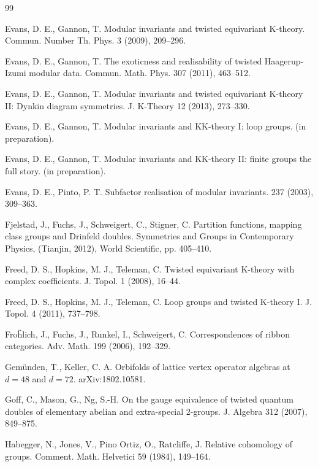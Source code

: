 \documentclass[12pt]{article}
\numberwithin{equation}{section}
\begin{document}
\begin{thebibliography}{99}
\begin{scriptsize}
 {Evans, D. E., Gannon, T.}
{Modular invariants and twisted equivariant K-theory.} {Commun. Number Th. 
Phys.} {3} (2009), 209--296.


 {Evans, D. E., Gannon, T.}
{The exoticness and realisability of twisted Haagerup-Izumi modular data.} 
Commun. Math. Phys. {307} (2011), 463--512. %

 {Evans, D. E., Gannon, T.}
{Modular invariants and twisted equivariant K-theory II: Dynkin diagram symmetries.} {J. K-Theory} 12 (2013), 273--330.


 {Evans, D. E., Gannon, T.}
{Modular invariants and KK-theory I: loop groups.} (in preparation).


 {Evans, D. E., Gannon, T.}
{Modular invariants and KK-theory II: finite groups the full story.} (in preparation).




{Evans, D. E., Pinto, P. T.}
{Subfactor realisation of modular invariants.} {\CMP} {237} 
{(2003)}, {309--363}.



 {Fjelstad, J., Fuchs, J., Schweigert, C., Stigner, C.} {Partition functions, mapping class groups and Drinfeld doubles.} Symmetries and Groups in Contemporary Physics,
(Tianjin, 2012), World Scientific, pp. 405--410.%


 {Freed, D. S., Hopkins, M. J., Teleman, C.} 
{Twisted equivariant K-theory
    with complex coefficients.} {J. Topol. 1 (2008), 16--44.}%

 {Freed, D. S., Hopkins, M. J., Teleman, C.}  {Loop groups and twisted K-theory I.} {  J. Topol.} 4 (2011),  737--798.%

 {Fro\"hlich, J., Fuchs, J., Runkel, I.,  Schweigert, C.} {Correspondences of ribbon categories.}  {Adv. Math.} 199 (2006), 192--329.


 {Gem\"unden, T., Keller, C. A.} {Orbifolds of lattice vertex operator algebras at $d=48$ and $d=72$.} arXiv:1802.10581.



 {Goff, C., Mason, G., Ng,  S.-H.} {On the gauge equivalence of twisted quantum doubles of elementary
abelian and extra-special 2-groups.} {J. Algebra} 312 (2007),  849--875.


 {Habegger, N., Jones, V., Pino Ortiz, O., Ratcliffe, J.} {Relative cohomology of groups.} {Comment. Math. Helvetici} {59} (1984), 149--164.


\end{scriptsize}
\end{thebibliography}
\end{document}
